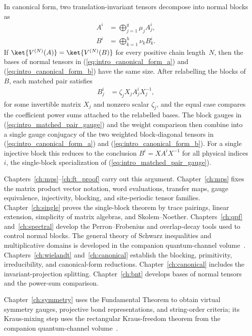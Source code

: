 In canonical form, two translation-invariant tensors decompose into normal
blocks as
\begin{align}
    A^i
     & = \bigoplus_{j=1}^{g} \mu_j A_j^i,
    \label{eq:intro_canonical_form_a}     \\
    B^i
     & = \bigoplus_{k=1}^{h} \nu_k B_k^i.
    \label{eq:intro_canonical_form_b}
\end{align}
If $\ket{V^{(N)}(A)}=\ket{V^{(N)}(B)}$ for every positive chain
length~$N$, then the bases of normal tensors in
(\ref{eq:intro_canonical_form_a}) and (\ref{eq:intro_canonical_form_b}) have
the same size. After relabelling the
blocks of $B$, each matched pair satisfies
\begin{align}
    B_j^i
     & = \zeta_j X_j A_j^i X_j^{-1},
    \label{eq:intro_matched_pair_gauge}
\end{align}
for some invertible matrix $X_j$ and nonzero scalar $\zeta_j$, and the equal
case compares the coefficient power sums attached to the relabelled bases. The
block gauges in (\ref{eq:intro_matched_pair_gauge}) and the weight
comparison then combine into a single gauge conjugacy of the two weighted
block-diagonal tensors in (\ref{eq:intro_canonical_form_a})
and (\ref{eq:intro_canonical_form_b}). For a single injective block this
reduces to the conclusion $B^i = X A^i X^{-1}$ for all physical
indices $i$, the single-block specialization of
(\ref{eq:intro_matched_pair_gauge}).

Chapters~\ref{ch:mps}--\ref{ch:ft_proof} carry out this argument.
Chapter~\ref{ch:mps} fixes the matrix product vector notation, word
evaluations, transfer maps, gauge equivalence, injectivity, blocking, and
site-periodic tensor families. Chapter~\ref{ch:single} proves the
single-block theorem by trace pairings, linear extension, simplicity of matrix
algebras, and Skolem--Noether. Chapters~\ref{ch:qpf}
and~\ref{ch:spectral} develop the Perron--Frobenius and
overlap-decay tools used to control normal blocks. The general theory of
Schwarz inequalities and multiplicative domains is developed in the companion
quantum-channel volume~\cite[Chapter ``Schwarz inequalities and multiplicative
    domains'']{QICLean2026Blueprint}. Chapters~\ref{ch:wielandt} and~\ref{ch:canonical}
establish the blocking, primitivity, irreducibility, and canonical-form reductions.
Chapter~\ref{ch:canonical} includes the invariant-projection splitting.
Chapter~\ref{ch:bnt} develops bases of normal tensors and the
power-sum comparison.

Chapter~\ref{ch:symmetry} uses the Fundamental Theorem to obtain virtual
symmetry gauges, projective bond representations, and string-order criteria;
its Kraus-mixing step uses the rectangular Kraus-freedom theorem from the
companion quantum-channel volume~\cite[``Rectangular Kraus
    freedom'']{QICLean2026Blueprint}.

